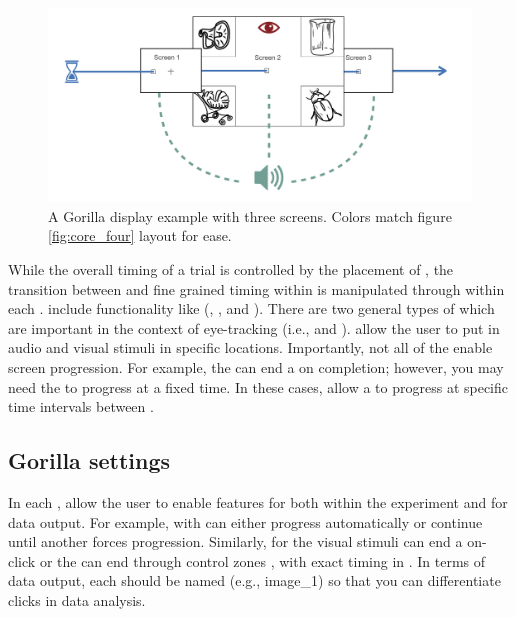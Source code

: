 \begin{figure}[h]
    \centering
    \includegraphics[scale=.5]{figures/Gorilla_work_flow.png}
    \caption{A Gorilla display example with three screens. Colors match figure \ref{fig:core_four} layout for ease.}
    \label{fig:Gorilla_work_flow}
\end{figure}

While the overall timing of a trial is controlled by the placement of , the transition between  and fine grained timing within  is manipulated through  within each .  include functionality like (, , and ). There are two general types of  which are important in the context of eye-tracking (i.e.,  and ).   allow the user to put in audio and visual stimuli in specific locations. Importantly, not all of the   enable screen progression. For example, the   can end a  on completion; however, you may need the  to progress at a fixed time. In these cases,   allow a  to progress at specific time intervals between .  

\subsection{Gorilla settings}

In each ,  allow the user to enable features for both within the experiment and for data output. For example,  with  can either progress automatically or continue until another  forces progression. Similarly,  for the visual stimuli can end a  on-click or the  can end through control zones , with exact timing in . In terms of data output, each  should be named (e.g., image\_1) so that you can differentiate clicks in data analysis.

